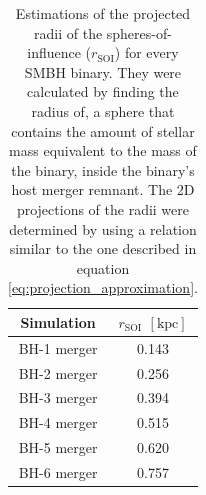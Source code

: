 \documentclass[english, twoside]{HYgradu}
\begin{document}
\begin{table}
	\begin{center}
		\begin{tabular}{| c | c |}
		\hline
		Simulation & $r_\mathrm{SOI}$ $\mathrm{[kpc]}$ \\
		\hline
		BH-1 merger & 0.143 \\
		BH-2 merger & 0.256 \\
		BH-3 merger & 0.394 \\
		BH-4 merger & 0.515 \\
		BH-5 merger & 0.620 \\
		BH-6 merger & 0.757 \\
		\hline
		\end{tabular}
	\end{center}
	\caption{Estimations of the projected radii of the spheres-of-influence ($r_\mathrm{SOI}$) for every SMBH binary. They were calculated by finding the radius of, a sphere that contains the amount of stellar mass equivalent to the mass of the binary, inside the binary's host merger remnant. The 2D projections of the radii were determined by using a relation similar to the one described in equation \ref{eq:projection_approximation}.}
	\label{table:s-o-i}
\end{table}
\end{document}
